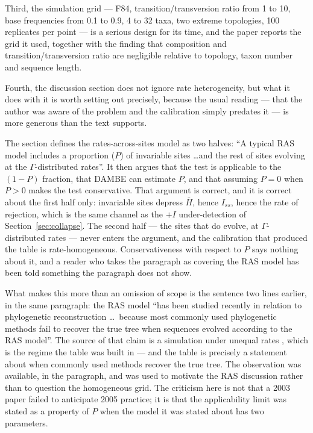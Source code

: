 \documentclass[11pt]{article}
\newcommand{\Iss}{I_{ss}}
\theoremstyle{definition}
\theoremstyle{remark}
\begin{document}
Third, the simulation grid --- F84, transition/transversion ratio from 1 to 10,
base frequencies from 0.1 to 0.9, 4 to 32 taxa, two extreme topologies, 100
replicates per point --- is a serious design for its time, and the paper reports
the grid it used, together with the finding that composition and
transition/transversion ratio are negligible relative to topology, taxon number
and sequence length.

Fourth, the discussion section does not ignore rate heterogeneity, but what it
does with it is worth setting out precisely, because the usual reading --- that
the author was aware of the problem and the calibration simply predates it ---
is more generous than the text supports.

The section defines the rates-across-sites model as two halves: ``A typical RAS
model includes a proportion ($P$) of invariable sites \ldots and the rest of
sites evolving at the $\Gamma$-distributed rates''. It then argues that the test
is applicable to the $(1-P)$ fraction, that DAMBE can estimate $P$, and that
assuming $P=0$ when $P>0$ makes the test conservative. That argument is correct,
and it is correct about the first half only: invariable sites depress $\bar H$,
hence $\Iss$, hence the rate of rejection, which is the same channel as the
$+I$ under-detection of Section~\ref{sec:collapse}. The second half --- the
sites that do evolve, at $\Gamma$-distributed rates --- never enters the
argument, and the calibration that produced the table is rate-homogeneous.
Conservativeness with respect to $P$ says nothing about it, and a reader who
takes the paragraph as covering the RAS model has been told something the
paragraph does not show.

What makes this more than an omission of scope is the sentence two lines
earlier, in the same paragraph: the RAS model ``has been studied recently in
relation to phylogenetic reconstruction \ldots\ because most commonly used
phylogenetic methods fail to recover the true tree when sequences evolved
according to the RAS model''. The source of that claim is a simulation under
unequal rates \citep{kuhner1994simulation}, which is the regime the table was
built in --- and the table is precisely a statement about when commonly used
methods recover the true tree. The observation was available, in the paragraph,
and was used to motivate the RAS discussion rather than to question the
homogeneous grid. The criticism here is not that a 2003 paper failed to
anticipate 2005 practice; it is that the applicability limit was stated as a
property of $P$ when the model it was stated about has two parameters.
\end{document}
